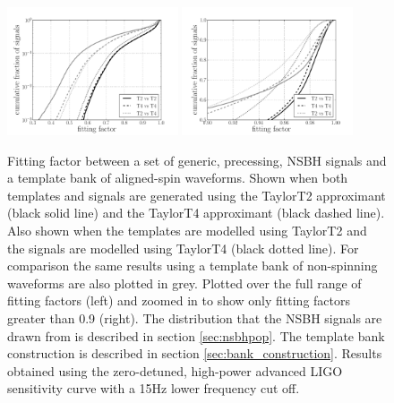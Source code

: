 \begin{figure}
    \centering
    \begin{minipage}[l]{2.0\columnwidth}
    \centering
\includegraphics[width=0.45\textwidth]
{papers/nsbh_effectualness/figure7A.pdf}
\includegraphics[width=0.45\textwidth]
{papers/nsbh_effectualness/figure7B.pdf}
\caption{\label{fig:aspineffectualness}
Fitting factor between a set of generic, precessing, NSBH signals and a
template bank of aligned-spin waveforms. Shown when both templates and signals
are generated using
the TaylorT2 approximant (black solid line) and the TaylorT4 approximant (black
dashed line).
Also shown when the templates are modelled using TaylorT2 and the signals are
modelled using TaylorT4 (black dotted line). For comparison the same results 
using a template bank of non-spinning waveforms are also plotted in grey. 
Plotted
over the full range of fitting factors (left) and zoomed in to show only
fitting factors greater than 0.9 (right). The
distribution that the NSBH signals are drawn from is described in section
\ref{sec:nsbhpop}. The template bank construction is described in section
\ref{sec:bank_construction}. Results obtained
using the zero-detuned, high-power advanced LIGO sensitivity curve with a 15Hz
lower frequency cut off.
}
\end{minipage}
\end{figure}


